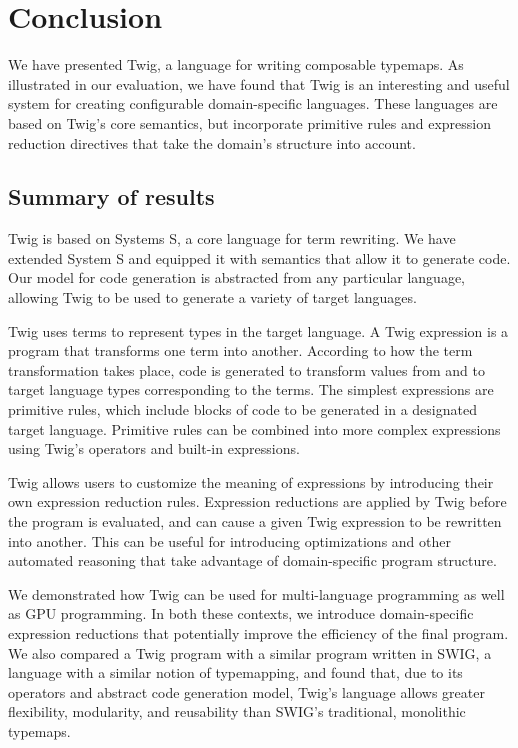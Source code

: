 
\chapter{Conclusion}

We have presented Twig, a language for writing composable
typemaps. As illustrated in our evaluation, we have found that
Twig is an interesting and useful system for creating configurable
domain-specific languages. These languages are based on Twig's
core semantics, but incorporate primitive rules and expression
reduction directives that take the domain's structure into
account.

\section{Summary of results}

Twig is based on Systems S, a core language for term rewriting. We
have extended System S and equipped it with semantics that allow
it to generate code. Our model for code generation is abstracted
from any particular language, allowing Twig to be used to generate
a variety of target languages.

Twig uses terms to represent types in the target language. A Twig
expression is a program that transforms one term into another.
According to how the term transformation takes place, code is
generated to transform values from and to target language types
corresponding to the terms. The simplest expressions are primitive
rules, which include blocks of code to be generated in a
designated target language. Primitive rules can be combined into
more complex expressions using Twig's operators and built-in
expressions.

Twig allows users to customize the meaning of expressions by
introducing their own expression reduction rules. Expression
reductions are applied by Twig before the program is evaluated,
and can cause a given Twig expression to be rewritten into
another. This can be useful for introducing optimizations and
other automated reasoning that take advantage of domain-specific
program structure.

We demonstrated how Twig can be used for multi-language
programming as well as GPU programming. In both these contexts, we
introduce domain-specific expression reductions that potentially
improve the efficiency of the final program. We also compared a
Twig program with a similar program written in SWIG, a language
with a similar notion of typemapping, and found that, due to its
operators and abstract code generation model, Twig's language
allows greater flexibility, modularity, and reusability than
SWIG's traditional, monolithic typemaps.

